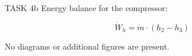 TASK 4b  
Energy balance for the compressor:  

\[
\dot{W}_h = \dot{m} \cdot (h_2 - h_3)
\]  

No diagrams or additional figures are present.
